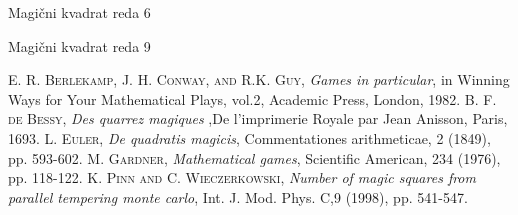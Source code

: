 \documentclass[a4paper,12pt]{article}
\theoremstyle{definition}
\theoremstyle{plain}
\begin{document}
Magični kvadrat reda 6

Magični kvadrat reda 9

%
%
\begin{thebibliography}{9}
   \textsc{E. R. Berlekamp, J. H. Conway, and R.K. Guy}, \emph{Games in particular}, in Winning Ways for Your Mathematical Plays, vol.2, Academic Press, London, 1982.
   \textsc{B. F. de Bessy}, \emph{Des quarrez magiques} ,De l’imprimerie Royale par Jean Anisson, Paris, 1693. 
\textsc{L. Euler}, \emph{De quadratis magicis}, Commentationes arithmeticae, 2 (1849), pp. 593-602.
\textsc{M. Gardner}, \emph{Mathematical games}, Scientific American, 234 (1976), pp. 118-122.
\textsc{K. Pinn and C. Wieczerkowski}, \emph{Number of magic squares from parallel tempering monte carlo}, Int. J. Mod. Phys. C,9 (1998), pp. 541-547.
\end{thebibliography}
\end{document}
